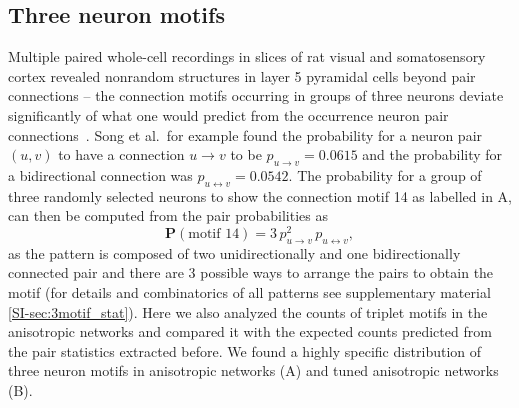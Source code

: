 \clearpage
\pagebreak
\newpage
\subsection*{Three neuron motifs}

Multiple paired whole-cell recordings in slices of rat visual and
somatosensory cortex revealed nonrandom structures in layer 5
pyramidal cells beyond pair connections -- the connection motifs
occurring in groups of three neurons deviate significantly of what one
would predict from the occurrence neuron pair
connections~\cite{Song2005, Perin2011}. Song et al.~for example found
the probability for a neuron pair $(u,v)$ to have a connection
$u \rightarrow v$ to be $p_{u \rightarrow v}= 0.0615$ and the
probability for a bidirectional connection was
$p_{u \leftrightarrow v} = 0.0542$. The probability for a group of
three randomly selected neurons to show the connection motif 14 as
labelled in A, can then be computed from the pair
probabilities as
\[
  \textbf{P}(\text{motif 14})= 3 \,p_{u \rightarrow v}^2
                                 \, p_{u \leftrightarrow v},
\]
as the pattern is composed of two unidirectionally and one
bidirectionally connected pair and there are 3 possible ways to
arrange the pairs to obtain the motif (for details and combinatorics of
all patterns see supplementary material
\ref{SI-sec:3motif_stat}). Here we also analyzed the counts of triplet
motifs in the anisotropic networks and compared it with the expected
counts predicted from the pair statistics extracted before. We found a
highly specific distribution of three neuron motifs in anisotropic
networks (A) and tuned anisotropic networks
(B).%
%

%

